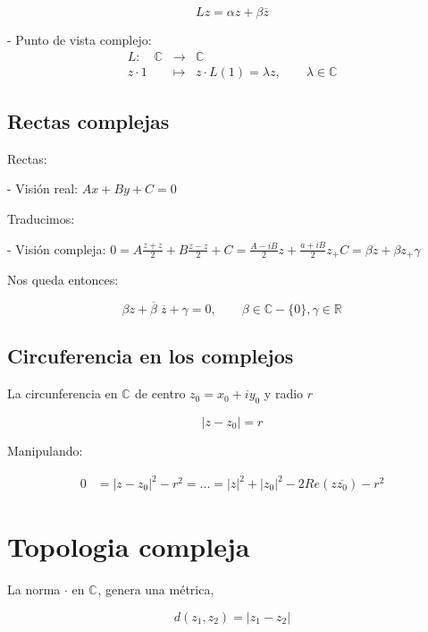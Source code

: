 \[Lz = \alpha z + \beta \overline{z}\]

- Punto de vista complejo:
\begin{eqnarray*}
  L : \quad \mathbb{C}^{ } & \rightarrow & \mathbb{C}^{} \\
  z \cdot 1 & \mapsto & z \cdot L(1) = \lambda z,  \qquad \lambda \in \mathbb{C}
\end{eqnarray*}

\subsection{Rectas complejas}

Rectas:

- Visión real: \(Ax + By + C = 0\)

Traducimos:

- Visión compleja: \(0 = A \frac{z+z}{2}+B \frac{z-z}{2} + C = \frac{A-iB}{2}z+\frac{a+iB}{2}z_ + C = \beta z + \beta z_ + \gamma \) 

Nos queda entonces:

\[\beta z + \overline{\beta} \; \overline{z} + \gamma = 0, \qquad \beta \in \mathbb{C}-\{0\}, \gamma \in \mathbb{R}^{}\]

\subsection{Circuferencia en los complejos}

\begin{definicion}
  La circunferencia en \(\mathbb{C}^{}\) de centro \(z_0=x_0+iy_0\) y radio \(r\)
  
  \begin{equation}
    |z-z_0| = r
  \end{equation}

  Manipulando:

\end{definicion}

\begin{eqnarray*} %
  0 & = |z-z_0|^2 -r^2 = ... = |z|^2+|z_0|^2-2 Re(z\overline{z_0}) - r^2
\end{eqnarray*}

\section{Topologia compleja}
La norma \( \cdot \) en \(\mathbb{C}^{}\), genera una métrica,

\[d(z_1,z_2) = |z_1 - z_2|\]

